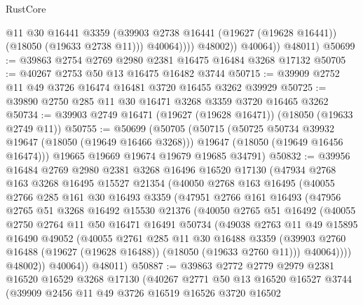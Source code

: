 \begin{lexlean}{RustCore}
\begin{coremodule}
                      @11
                      @30
                      @16441
                      @3359
                      (@39903 @2738 @16441 (@19627 (@19628 @16441)) (@18050 (@19633 @2738 @11)))
                      @40064))))
              @48002))
          @40064))
      @48011)
@50699 := @39863 @2754 @2769 @2980 @2381 @16475 @16484 @3268 @17132
@50705 := @40267 @2753 @50 @13 @16475 @16482 @3744
@50715 := @39909 @2752 @11 @49 @3726 @16474 @16481 @3720 @16455 @3262 @39929
@50725 := @39890 @2750 @285 @11 @30 @16471 @3268 @3359 @3720 @16465 @3262
@50734 := @39903 @2749 @16471 (@19627 (@19628 @16471)) (@18050 (@19633 @2749 @11))
@50755 := @50699
    (@50705
      (@50715
        (@50725 @50734 @39932 @19647 (@18050 (@19649 @16466 @3268)))
        @19647
        (@18050 (@19649 @16456 @16474)))
      @19665
      @19669
      @19674
      @19679
      @19685
      @34791)
@50832 := @39956
    @16484
    @2769
    @2980
    @2381
    @3268
    @16496
    @16520
    @17130
    (@47934
      @2768
      @163
      @3268
      @16495
      @15527
      @21354
      (@40050
        @2768
        @163
        @16495
        (@40055
          @2766
          @285
          @161
          @30
          @16493
          @3359
          (@47951
            @2766
            @161
            @16493
            (@47956
              @2765
              @51
              @3268
              @16492
              @15530
              @21376
              (@40050
                @2765
                @51
                @16492
                (@40055
                  @2750
                  @2764
                  @11
                  @50
                  @16471
                  @16491
                  @50734
                  (@49038
                    @2763
                    @11
                    @49
                    @15895
                    @16490
                    @49052
                    (@40055
                      @2761
                      @285
                      @11
                      @30
                      @16488
                      @3359
                      (@39903 @2760 @16488 (@19627 (@19628 @16488)) (@18050 (@19633 @2760 @11)))
                      @40064))))
              @48002))
          @40064))
      @48011)
@50887 := @39863
    @2772
    @2779
    @2979
    @2381
    @16520
    @16529
    @3268
    @17130
    (@40267
      @2771
      @50
      @13
      @16520
      @16527
      @3744
      (@39909
        @2456
        @11
        @49
        @3726
        @16519
        @16526
        @3720
        @16502

\end{coremodule}
\end{lexlean}
